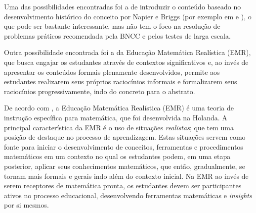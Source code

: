 \begin{apresentacao}
Uma das possibilidades encontradas foi a de introduzir o conteúdo baseado no desenvolvimento histórico do conceito por Napier e Briggs (por exemplo em \cite{Pedrosa2018} e \cite{Panagiotou2011}), o que pode ser bastante interessante, mas não tem o foco na resolução de problemas práticos recomendada pela BNCC e pelos testes de larga escala.

Outra possibilidade encontrada foi a da Educação Matemática Realística (EMR), que busca engajar os estudantes através de contextos significativos e, ao invés de apresentar os conteúdos formais plenamente desenvolvidos, permite aos estudantes realizarem seus próprios raciocínios informais e formalizarem seus raciocínios progressivamente, indo do concreto para o abstrato.

De acordo com  \cite{HeuvelPanhuizen}, a Educação Matemática Realística (EMR) é uma teoria de instrução específica para matemática, que foi desenvolvida na Holanda. A principal característica da EMR é o uso de situações \textit{realistas}; que tem uma posição de destaque no processo de aprendizagem. Estas situações servem como fonte para iniciar o desenvolvimento de conceitos, ferramentas e procedimentos matemáticos em um contexto no qual os estudantes podem, em uma etapa posterior, aplicar seus conhecimentos matemáticos, que então, gradualmente, se tornam mais formais e gerais indo além do contexto inicial. Na EMR ao invés de serem receptores de matemática pronta, os estudantes devem ser participantes ativos no processo educacional, desenvolvendo ferramentas matemáticas e \textit{insights} por si mesmos.


\end{apresentacao}
